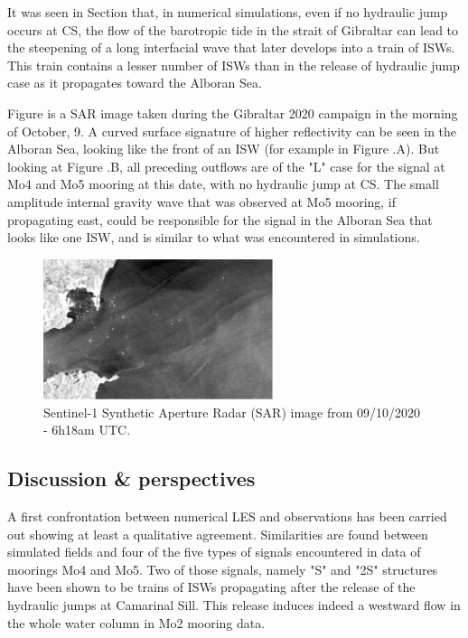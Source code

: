 It was seen in Section  that, in numerical simulations, even if no hydraulic jump occurs at CS, the flow of the barotropic tide in the strait of Gibraltar can lead to the steepening of a long interfacial wave that later develops into a train of ISWs. This train contains a lesser number of ISWs than in the release of hydraulic jump case as it propagates toward the Alboran Sea. 

Figure  is a SAR image taken during the Gibraltar 2020 campaign in the morning of October, 9. A curved surface signature of higher reflectivity can be seen in the Alboran Sea, looking like the front of an ISW (for example in Figure .A). But looking at Figure .B, all preceding outflows are of the "L" case for the signal at Mo4 and Mo5 mooring at this date, with no hydraulic jump at CS. The small amplitude internal gravity wave that was observed at Mo5 mooring, if propagating east, could be responsible for the signal in the Alboran Sea that looks like one ISW, and is similar to what was encountered in simulations.

\begin{figure}[!h]
 \centering
 \includegraphics[width=0.6\textwidth]{./GBR3D/SAR_OBS_GEPETO.png}
 \caption [Sentinel-1 SAR image.]{Sentinel-1 Synthetic Aperture Radar (SAR) image from 09/10/2020 - 6h18am UTC.}
 \label{fig_SAROBS}
\end{figure}


\subsection{Discussion \& perspectives}

A first confrontation between numerical LES and observations has been carried out showing at least a qualitative agreement. Similarities are found between simulated fields and four of the five types of signals encountered in data of moorings Mo4 and Mo5. Two of those signals, namely "S" and "2S" structures have been shown to be trains of ISWs propagating after the release of the hydraulic jumps at Camarinal Sill. This release induces indeed a westward flow in the whole water column in Mo2 mooring data. 

